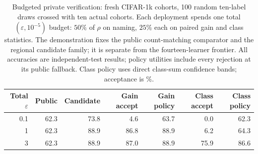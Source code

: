 \begin{table}[t]
\caption{Budgeted private verification: fresh CIFAR-1k cohorts, 100 random ten-label draws crossed with ten actual cohorts. Each deployment spends one total $(\varepsilon,10^{-5})$ budget: $50\%$ of $\rho$ on naming, $25\%$ each on paired gain and class statistics. The demonstration fixes the public count-matching comparator and the regional candidate family; it is separate from the fourteen-learner frontier. All accuracies are independent-test results; policy utilities include every rejection at its public fallback. Class policy uses direct class-sum confidence bands; acceptance is \%.}
\label{tab:private-validation}\small
\centering
\begin{tabular}{@{}rrrrrrr@{}}\toprule
Total $\varepsilon$ & Public & Candidate & Gain accept & Gain policy & Class accept & Class policy \\
\midrule
0.1 & 62.3 & 73.8 & 4.6 & 63.7 & 0.0 & 62.3 \\
1 & 62.3 & 88.9 & 86.8 & 88.9 & 6.2 & 64.3 \\
3 & 62.3 & 88.9 & 87.0 & 88.9 & 75.9 & 86.6 \\
\bottomrule\end{tabular}
\end{table}
